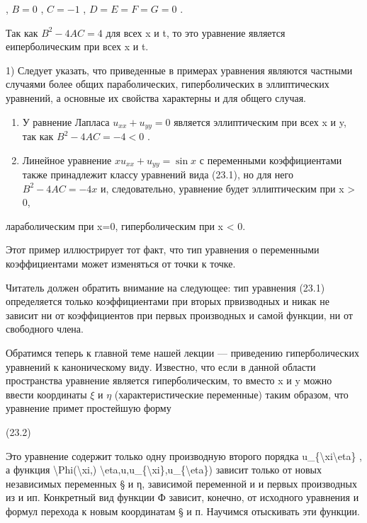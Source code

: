 \documentclass[
]{article}
\begin{document}
, \(B=0\) , \(C=-1\) , \(D=E=F=G=0\) .

Так как \(B^2 - 4AC = 4\) для всех x и t, то это уравнение является
еиперболическим при всех x и t.

1) Следует указать, что приведенные в примерах уравнения являются
частными случаями более общих параболических, гиперболических в
эллиптических уравнений, а основные их свойства характерны и для общего
случая.

\begin{enumerate}
\def\labelenumi{\arabic{enumi}.}
\setcounter{enumi}{2}
\item
  У равнение Лапласа \(u_{xx} + u_{yy} = 0\) является эллиптическим при
  всех x и y, так как \(B^2 - 4AC = - 4 < 0\) .
\item
  Линейное уравнение \(xu_{xx} + u_{yy} = \sin x\) с переменными
  коэффициентами также принадлежит классу уравнений вида (23.1), но для
  него \(B^2-4AC=-4x\) и, следовательно, уравнение будет эллиптическим
  при x \textgreater{} 0,
\end{enumerate}

лараболическим при x=0, гиперболическим при x \textless{} 0.

Этот пример иллюстрирует тот факт, что тип уравнения о переменными
коэффициентами может изменяться от точки к точке.

Читатель должен обратить внимание на следующее: тип уравнения (23.1)
определяется только коэффициентами при вторых првизводных и никак не
зависит ни от коэффициентов при первых производных и самой функции, ни
от свободного члена.

Обратимся теперь к главной теме нашей лекции --- приведению
гиперболических уравнений к каноническому виду. Известно, что если в
данной области пространства уравнение является гиперболическим, то
вместо x и y можно ввести координаты \(\xi\) и \(\eta\)
(характеристические переменные) таким образом, что уравнение примет
простейшую форму

(23.2)

Это уравнение содержит только одну производную второго порядка
u\_\{\textbackslash xi\textbackslash eta\} , а функция
\textbackslash Phi(\textbackslash xi,)
\textbackslash eta,u,u\_\{\textbackslash xi\},u\_\{\textbackslash eta\})
зависит только от новых независимых переменных § и η, зависимой
переменной и и первых производных из и ип. Конкретный вид функции Ф
зависит, конечно, от исходного уравнения и формул перехода к новым
координатам § и п. Научимся отыскивать эти функции.
\end{document}
